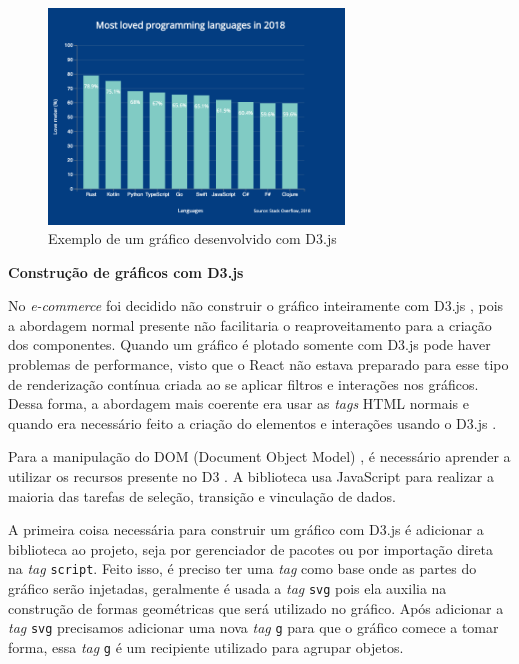 {{\begin{figure}[ht]
  	\center
    \includegraphics[width=0.7\textwidth]{images/exemplo-graf-d3.png}
    \caption{Exemplo de um gráfico desenvolvido com D3.js}
\end{figure} 

}

\vspace{1cm}
{\centerline{\textbf{Construção de gráficos com D3.js}}}
No \textit{e-commerce} foi decidido não construir o gráfico inteiramente com D3.js \cite{D3}, pois a abordagem normal presente não facilitaria o reaproveitamento para a criação dos componentes. Quando um gráfico é plotado somente com D3.js \cite{D3} pode haver problemas de performance, visto que o React \cite{REACT} não estava preparado para esse tipo de renderização contínua criada ao se aplicar filtros e interações nos gráficos. Dessa forma, a abordagem mais coerente era usar as \textit{tags} HTML \cite{HTML} normais e quando era necessário feito a criação do elementos e interações usando o D3.js \cite{D3}.

Para a manipulação do DOM (Document Object Model) \cite{DOM}, é necessário aprender a utilizar os recursos presente no D3 \cite{D3}. A biblioteca usa JavaScript para realizar a maioria das tarefas de seleção, transição e vinculação de dados.

A primeira coisa necessária para construir um gráfico com D3.js \cite{D3} é adicionar a biblioteca ao projeto, seja por gerenciador de pacotes ou por importação direta na \textit{tag} \lstinline{script}. Feito isso, é preciso ter uma \textit{tag} como base onde as partes do gráfico serão injetadas, geralmente é usada a \textit{tag} \lstinline{svg} pois ela auxilia na construção de formas geométricas que será utilizado no gráfico. Após adicionar a \textit{tag} \lstinline{svg} precisamos adicionar uma nova \textit{tag} \lstinline{g} para que o gráfico comece a tomar forma, essa \textit{tag} \lstinline{g} é um recipiente utilizado para agrupar objetos.

}
